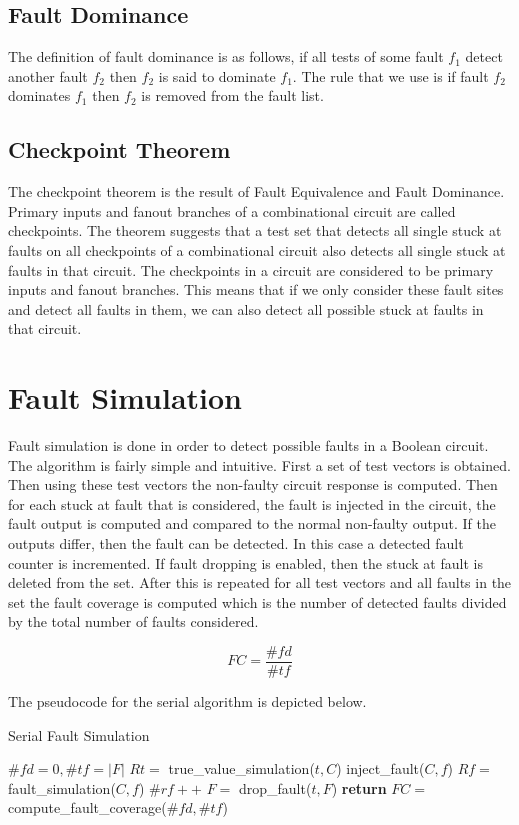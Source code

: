 \documentclass[a4paper,11pt]{article}
\begin{document}
\subsection*{Fault Dominance}
The definition of fault dominance is as follows, if all tests of some fault $f_1$ detect another fault $f_2$ then $f_2$ is said to dominate $f_1$. The rule that we use is if fault $f_2$ dominates $f_1$ then $f_2$ is removed from the fault list.

\subsection*{Checkpoint Theorem}
The checkpoint theorem is the result of Fault Equivalence and Fault Dominance. Primary inputs and fanout branches of a combinational circuit are called checkpoints. The theorem suggests that a test set that detects all single stuck at faults on all checkpoints of a combinational circuit also detects all single stuck at faults in that circuit. The checkpoints in a circuit are considered to be primary inputs and fanout branches. This means that if we only consider these fault sites and detect all faults in them, we can also detect all possible stuck at faults in that circuit.

\clearpage
\section*{Fault Simulation}
Fault simulation is done in order to detect possible faults in a Boolean circuit. The algorithm is fairly simple and intuitive. First a set of test vectors is obtained. Then using these test vectors the non-faulty circuit response is computed. Then for each stuck at fault that is considered, the fault is injected in the circuit, the fault output is computed and compared to the normal non-faulty output. If the outputs differ, then the fault can be detected. In this case a detected fault counter is incremented. If fault dropping is enabled, then the stuck at fault is deleted from the set. After this is repeated for all test vectors and all faults in the set the fault coverage is computed which is the number of detected faults divided by the total number of faults considered. 

$$FC = \frac{\#fd}{\#tf}$$

The pseudocode for the serial algorithm is depicted below.

\begin{algorithm}
	\caption{Serial Fault Simulation} 
	\begin{algorithmic}[1]
		\State $\#fd = 0, \#tf = |F|$
			\State $Rt = $ true\_value\_simulation($t,C$)
					\State inject\_fault($C,f$)
					\State $Rf = $ fault\_simulation($C,f$)
					\State $\#rf++$
					\State $F = $ drop\_fault($t,F$)
				\EndIf	
			\EndFor
		\EndFor
					\State \textbf{return} $FC = $ compute\_fault\_coverage($\#fd,\#tf$)
	\end{algorithmic} 
\end{algorithm}
\end{document}

